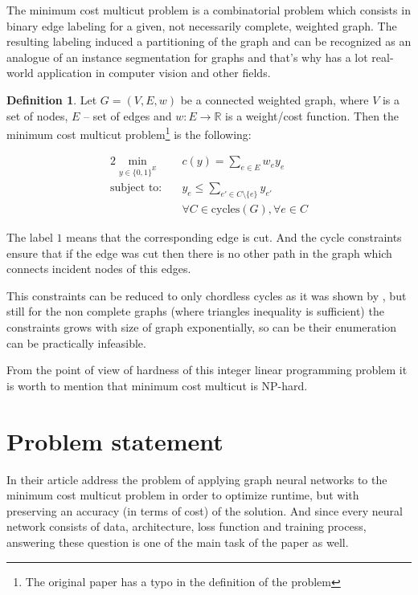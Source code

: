 \documentclass[10pt, twocolumn, a4paper]{article}
\theoremstyle{definition}
\newtheorem{definition}{Definition}
\begin{document}
The minimum cost multicut problem is a combinatorial problem which consists in binary
edge labeling for a given, not necessarily complete, weighted graph. The resulting labeling induced
a partitioning of the graph and can be recognized as an analogue of an instance segmentation for graphs and
that's why has a lot real-world application in computer vision and other fields.

\begin{definition}
    Let $G = (V, E, w)$ be a connected weighted graph, where $V$ is a set of nodes, $E$ -- set of edges and
    $w: E \to \mathbb{R}$ is a weight/cost function. Then the minimum cost multicut
    problem\footnote{The original paper has a typo in the definition of the problem}
    is the following:

    \begin{alignat}{2}
        \min_{y \in \{0, 1\}^E} \quad &
        c(y) = \sum\limits_{e \in E} w_e y_e                                                      \label{def:cost}                  \\
        \text{subject to:}      \quad &
        y_e \leq \sum\limits_{e' \in C \setminus \{e\}} y_{e'}                                         \label{def:cycle_constraint} \\
                                      & \forall C \in \text{cycles}(G), \forall e \in C \nonumber
    \end{alignat}
\end{definition}

The label $1$ means that the corresponding edge is cut.
And the cycle constraints ensure that if the edge was cut then there is no other path in the graph which connects
incident nodes of this edges.

This constraints can be reduced to only chordless cycles as it was shown by \citet{chopra1993partition}, but still for the
non complete graphs (where triangles inequality is sufficient) the constraints grows with size of graph exponentially, so can be
their enumeration can be practically infeasible.

From the point of view of hardness of this integer linear programming problem it is worth to mention that minimum cost multicut
is NP-hard.


\section{Problem statement}

In their article \citet{jung2022learning} address the problem of applying graph neural networks to
the minimum cost multicut problem in order to optimize runtime, but with preserving an
accuracy (in terms of cost) of the solution. And since every neural network consists of
data, architecture, loss function and training process, answering these question is one of the main
task of the paper as well.
\end{document}
